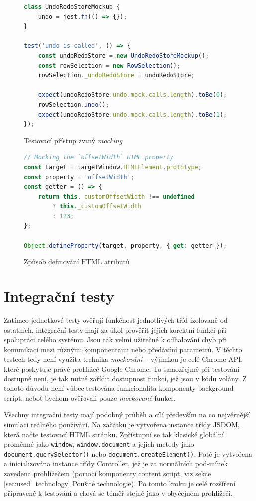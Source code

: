 \documentclass[thesis=B,czech]{FITthesis}[2012/06/26]
\begin{document}
\begin{figure}
	\begin{lstlisting}[language=JavaScript]
class UndoRedoStoreMockup {
	undo = jest.fn(() => {});
}
	
test('undo is called', () => {
	const undoRedoStore = new UndoRedoStoreMockup();
	const rowSelection = new RowSelection();
	rowSelection._undoRedoStore = undoRedoStore;
	
	expect(undoRedoStore.undo.mock.calls.length).toBe(0);
	rowSelection.undo();
	expect(undoRedoStore.undo.mock.calls.length).toBe(1);
});
	\end{lstlisting}
	\caption{Testovací přístup zvaný \emph{mocking}}
	\label{code:mocking}
\end{figure}

\begin{figure}
	\begin{lstlisting}[language=JavaScript]
// Mocking the `offsetWidth` HTML property
const target = targetWindow.HTMLElement.prototype;
const property = 'offsetWidth';
const getter = () => {
	return this._customOffsetWidth !== undefined 
		? this._customOffsetWidth 
		: 123;
};

Object.defineProperty(target, property, { get: getter });
	\end{lstlisting}
	\caption{Způsob definování HTML atributů}
	\label{code:setup}
\end{figure}



\section{Integrační testy}
Zatímco jednotkové testy ověřují funkčnost jednotlivých tříd izolovaně od ostatních, integrační testy mají za úkol prověřit jejich korektní funkci při spolupráci celého systému. Jsou tak velmi užitečné k odhalování chyb při komunikaci mezi různými komponentami nebo předávání parametrů. V těchto testech tedy není využita technika \textit{mockování} -- výjimkou je celé Chrome API, které poskytuje právě prohlížeč Google Chrome. To samozřejmě při testování dostupné není, je tak nutné zařídit dostupnost funkcí, jež jsou v kódu volány. Z tohoto důvodu není vůbec testována funkcionalita komponenty background script, neboť bychom ověřovali pouze \textit{mockované} funkce.

Všechny integrační testy mají podobný průběh a cílí především na co nejvěrnější simulaci reálného používání. Na začátku je vytvořena instance třídy JSDOM, která načte testovací HTML stránku. Zpřístupní se tak klasické globální proměnné jako \verb|window|, \verb|window.document| a jejich metody jako \verb|document.querySelector()| nebo \verb|document.createElement()|. Poté je vytvořena a inicializována instance třídy Controller, jež je za normálních pod-mínek zavedena prohlížečem (pomocí komponenty \hyperref[def:content_script]{content script}, viz sekce \ref{sec:used_technology} Použité technologie). Po tomto kroku je celé rozšíření připravené k testování a chová se téměř stejně jako v obyčejném prohlížeči.
\end{document}
